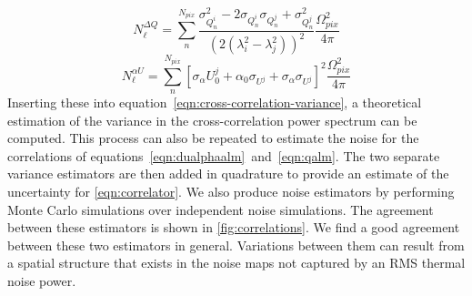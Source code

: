 \documentclass[usenatbib,hidelinks]{mnras}
\begin{document}
{{\begin{equation}
N_{\ell}^{\Delta Q} = \sum_{n}^{N_{pix}} \frac{\sigma_{Q_{n}^{i}}^{2} -2\sigma_{Q_{n}^{i}}\sigma_{Q_{n}^{j}} + \sigma_{Q_{n}^{j}}^{2}}{ \left( 2(\lambda_{i}^{2}-\lambda_{j}^{2}) \right)^{2}} \frac{\Omega_{pix}^{2}}{4\pi}  \label{eqn:noise-delta-q}
\end{equation}
\begin{equation}
N_{\ell}^{\alpha U} =  \sum_{n}^{N_{pix}} \left[ \sigma_{\alpha} U^{j}_{0} + \alpha_{0}\sigma_{ U^{j}} + \sigma_{\alpha} \sigma_{ U^{j}} \right]^{2} \frac{\Omega_{pix}^{2}}{4\pi}  \label{eqn:noise-alpha-u}
\end{equation}
Inserting these into equation~\ref{eqn:cross-correlation-variance}, a theoretical estimation of the variance in the cross-correlation power spectrum can be computed. This process can also be repeated to estimate the noise for the correlations of equations~\ref{eqn:dualphaalm}~and~\ref{eqn:qalm}. The two separate variance estimators are then added in quadrature to provide an estimate of the uncertainty for \autoref{eqn:correlator}. We also produce noise estimators by performing Monte Carlo simulations over independent noise simulations. The agreement between these estimators is shown in \autoref{fig:correlations}.  We find a good agreement between these two estimators in general. Variations between them can result from a spatial structure that exists in the noise maps not captured by an RMS thermal noise power.
}

}
\end{document}
